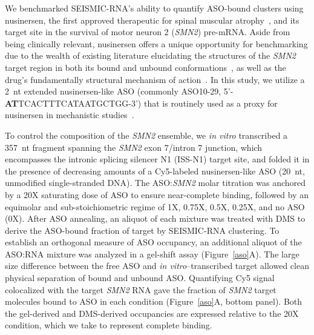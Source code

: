 \documentclass[unnumsec,webpdf,contemporary,large]{oup-authoring-template}%
\theoremstyle{thmstyleone}%
\theoremstyle{thmstyletwo}%
\theoremstyle{thmstylethree}%
\begin{document}
We benchmarked SEISMIC-RNA's ability to quantify ASO-bound clusters using nusinersen, the first approved therapeutic for spinal muscular atrophy~\cite{Ottesen2017,Finkel2017,Mercuri2018}, and its target site in the survival of motor neuron 2 (\textit{SMN2}) pre-mRNA. Aside from being clinically relevant, nusinersen offers a unique opportunity for benchmarking due to the wealth of existing literature elucidating the structures of the \textit{SMN2} target region in both its bound and unbound conformations~\cite{Singh2007,Singh2015,Singh2026}, as well as the drug's fundamentally structural mechanism of action~\cite{Singh2010,Singh2013,Singh2015}. In this study, we utilize a 2~nt extended nusinersen-like ASO (commonly ASO10-29, 5'-\textbf{AT}TCACTTTCATAATGCTGG-3') that is routinely used as a proxy for nusinersen in mechanistic studies~\cite{Marasco2022,Sheng2020,Doktor2017,Zhou2025}.

To control the composition of the \textit{SMN2} ensemble, we \textit{in vitro} transcribed a 357~nt fragment spanning the \textit{SMN2} exon 7/intron 7 junction, which encompasses the intronic splicing silencer N1 (ISS-N1) target site, and folded it in the presence of decreasing amounts of a Cy5-labeled nusinersen-like ASO (20~nt, unmodified single-stranded DNA). The ASO:\textit{SMN2} molar titration was anchored by a 20X saturating dose of ASO to ensure near-complete binding, followed by an equimolar and sub-stoichiometric regime of 1X, 0.75X, 0.5X, 0.25X, and no ASO (0X). After ASO annealing, an aliquot of each mixture was treated with DMS to derive the ASO-bound fraction of target by SEISMIC-RNA clustering. To establish an orthogonal measure of ASO occupancy, an additional aliquot of the ASO:RNA mixture was analyzed in a gel-shift assay (Figure~\ref{aso}A). The large size difference between the free ASO and \textit{in vitro}--transcribed target allowed clean physical separation of bound and unbound ASO. Quantifying Cy5 signal colocalized with the target \textit{SMN2} RNA gave the fraction of \textit{SMN2} target molecules bound to ASO in each condition (Figure~\ref{aso}A, bottom panel). Both the gel-derived and DMS-derived occupancies are expressed relative to the 20X condition, which we take to represent complete binding.
\end{document}
